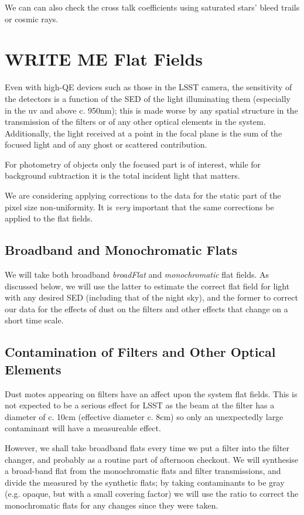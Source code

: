 \documentclass[DM,authoryear,toc,lsstdraft]{lsstdoc}
\begin{document}
We can can also check the cross talk coefficients using saturated stars' bleed
trails or cosmic rays\citep{2012PASP..124.1347Y}.

\section{WRITE ME Flat Fields}

Even with high-QE devices such as those in the LSST camera, the sensitivity of the detectors is a function of
the SED of the light illuminating them (especially in the uv and above c. 950nm); this is made worse by any
spatial structure in the transmission of the filters or of any other optical elements in the system.
Additionally, the light received at a point in the focal plane is the sum of the focused light and of any
ghost or scattered contribution.

For photometry of objects only the focused part is of interest, while for background subtraction it is the
total incident light that matters.

We are considering applying corrections to the data for the static part of the pixel size non-uniformity.  It is
\emph{very} important that the same corrections be applied to the flat fields.

\subsection{Broadband and Monochromatic Flats}

We will take both broadband \emph{broadFlat} and \emph{monochromatic} flat fields.  As discussed below, we will use the
latter to estimate the correct flat field for light with any desired SED (including that of the night sky),
and the former to correct our data for the effects of dust on the filters and other effects that change on a
short time scale.

\subsection{Contamination of Filters and Other Optical Elements}

Dust motes appearing on filters have an affect upon the system flat fields.  This is not expected to be
a serious effect for LSST as the beam at the filter has a diameter of c. 10cm (effective diameter c. 8cm)
so only an unexpectedly large contaminant will have a measureable effect.

However, we shall take broadband flats every time we put a filter into the filter
changer, and probably as a routine part of afternoon checkout.  We will synthesise a broad-band flat from the
monochromatic flats and filter transmissions, and divide the
measured by the synthetic flats; by taking contaminants to be gray (e.g. opaque, but with a small covering
factor) we will use the ratio to correct the monochromatic flats for any changes since they were taken.
\end{document}
